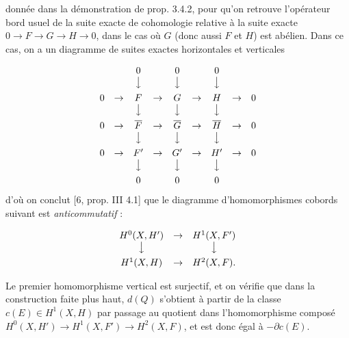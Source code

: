 
donnée dans la démonstration de prop. 3.4.2, pour qu'on retrouve l'opérateur
bord usuel de la suite exacte de cohomologie relative à la suite exacte
$0\to F\to G\to H\to0$, dans
le cas où $G$ (donc aussi $F$ et $H$) est abélien. Dans ce cas, on a un
diagramme de suites exactes horizontales et verticales

\[
\begin{array}{ccccccccc}
&&0&&0&&0&&\\
&&\big\downarrow&&\big\downarrow&&\big\downarrow&&\\[0.45em]
0&\to&F&\to&G&\to&H&\to&0\\
&&\big\downarrow&&\big\downarrow&&\big\downarrow&&\\[0.45em]
0&\to&\overline F&\to&\overline G&\to&\overline H&\to&0\\
&&\big\downarrow&&\big\downarrow&&\big\downarrow&&\\[0.45em]
0&\to&F'&\to&G'&\to&H'&\to&0\\
&&\big\downarrow&&\big\downarrow&&\big\downarrow&&\\[0.45em]
&&0&&0&&0&&
\end{array}
\]
d'où on conclut [6, prop. III 4.1] que le diagramme d'homomorphismes cobords
suivant est \textit{anticommutatif} :

\[
\begin{array}{ccc}
H^0(X,H')&\to&H^1(X,F')\\
\big\downarrow&&\big\downarrow\\[0.45em]
H^1(X,H)&\to&H^2(X,F).
\end{array}
\]

Le premier homomorphisme vertical est surjectif, et on vérifie que dans la
construction faite plus haut, $d(Q)$ s'obtient à partir de la classe
$c(E)\in H^1(X,H)$ par passage au quotient dans l'homomorphisme composé
$H^0(X,H')\to H^1(X,F')\to H^2(X,F)$,
et est donc égal à $-\partial c(E)$.

